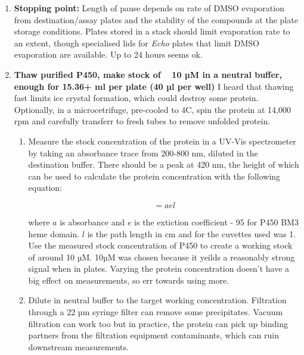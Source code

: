 \documentclass[16pt]{book}
\begin{document}
\begin{enumerate}
	\item \textbf{Stopping point:} Length of pause depends on rate of DMSO evaporation from destination/assay plates and the stability of the compounds at the plate storage conditions. 
		Plates stored in a stack should limit evaporation rate to an extent, though specialised lids for \textit{Echo} plates that limit DMSO evaporation are available.
Up to 24 hours seems ok.

\item \textbf{Thaw purified P450, make stock of ~ 10 µM in a neutral buffer, enough for 15.36+ ml per plate (40 µl per well)}
I heard that thawing fast limits ice crystal formation, which could destroy some protein.
Optionally, in a microcetrifuge, pre-cooled to 4C, spin the protein at 14,000 rpm and carefully transferr to fresh tubes to remove unfolded protein.
	\begin{enumerate}

	\item Measure the stock concentration of the protein in a UV-Vis spectrometer by taking an absorbance trace from 200-800 nm, diluted in the destination buffer.
	There should be a peak at 420 nm, the height of which can be used to calculate the protein concentration with the following equation:

			\begin{equation}
				[P450]  = a e l  
			\end{equation}

       where $a$ is absorbance and $e$ is the extiction coefficient - 95 for P450 BM3 heme domain.
       $l$ is the path length in cm and for the cuvettes used was 1.
       Use the measured stock concentration of P450 to create a working stock of around 10 µM.
       10µM was chosen because it yeilds a reasonably strong signal when in plates.
       Varying the protein concentration doesn't have a big effect on measurements, so err towards using more.


	\item Dilute in neutral buffer to the target working concentration.
	Filtration through a 22 µm syringe filter can remove some precipitates.
	Vacuum filtration can work too but in practice, the protein can pick up binding partners from the filtration equipment contaminants, which can ruin downstream measurements.
	\end{enumerate}


\end{enumerate}
\end{document}

